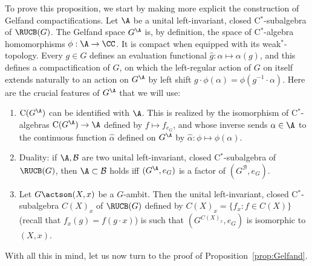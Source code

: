 To prove this proposition, we start by making more explicit the construction of Gelfand compactifications. Let $\A$ be a unital left-invariant, closed C$^{*}$-subalgebra of $\RUCB(G)$. The Gelfand space $G^{\A}$ is, by definition, the space of C$^{*}$-algebra homomorphisms $\phi:\A\rightarrow \CC$. It is compact when equipped with its weak$^{*}$-topology. Every $g\in G$ defines an evaluation functional $\hat g:\alpha\mapsto\alpha(g)$, and this defines a compactification of $G$, on which the left-regular action of $G$ on itself extends naturally to an action on $G^{\A}$ by left shift $g\cdot \phi(\alpha)=\phi(g^{-1}\cdot \alpha)$. Here are the crucial features of $G^{\A}$ that we will use:
\begin{enumerate}
\item $\mathrm C(G^{\A})$ can be identified with $\A$. This is realized by the isomorphism of C$^{*}$-algebras $\mathrm C(G^{\A})\to\A$ defined by $f\mapsto f_{e_{G}}$, and whose inverse sends $\alpha\in \A$ to the continuous function $\hat \alpha$ defined on $G^{\A}$ by $\hat \alpha : \phi\mapsto \phi(\alpha)$.
\item Duality: if $\A, \mathcal B$ are two unital left-invariant, closed C$^{*}$-subalgebra of $\RUCB(G)$, then $\A \subset \mathcal B$ holds iff $(G^{\A}, e_{G})$ is a factor of $(G^{\mathcal B}, e_{G})$.
\item Let $G\actson(X,x)$ be a $G$-ambit. Then the unital left-invariant, closed C$^{*}$-subalgebra $C(X)_{x}$ of $\RUCB(G)$ defined by $C(X)_{x} = \{ f_{x}:f\in C(X)\}$ (recall that $f_{x}(g)=f(g\cdot x)$) is such that $(G^{C(X)_{x}},e_{G})$ is isomorphic to $(X,x)$.
\end{enumerate}

With all this in mind, let us now turn to the proof of Proposition~\ref{prop:Gelfand}.

